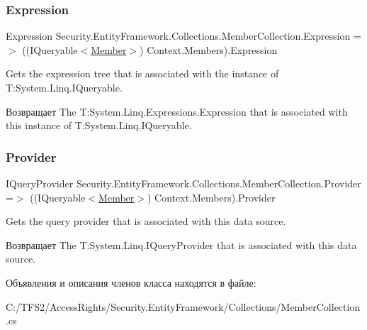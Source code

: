 \subsubsection{\texorpdfstring{Expression}{Expression}}
{\footnotesize\ttfamily Expression Security.\+Entity\+Framework.\+Collections.\+Member\+Collection.\+Expression =$>$ ((I\+Queryable$<$\hyperlink{class_security_1_1_model_1_1_member}{Member}$>$) Context.\+Members).Expression}



Gets the expression tree that is associated with the instance of T\+:\+System.\+Linq.\+I\+Queryable. 

\begin{DoxyReturn}{Возвращает}
The T\+:\+System.\+Linq.\+Expressions.\+Expression that is associated with this instance of T\+:\+System.\+Linq.\+I\+Queryable. 
\end{DoxyReturn}
\mbox{\label{class_security_1_1_entity_framework_1_1_collections_1_1_member_collection_ad6b2df9f7a78c07be30abd81acf88f77}} 
\subsubsection{\texorpdfstring{Provider}{Provider}}
{\footnotesize\ttfamily I\+Query\+Provider Security.\+Entity\+Framework.\+Collections.\+Member\+Collection.\+Provider =$>$ ((I\+Queryable$<$\hyperlink{class_security_1_1_model_1_1_member}{Member}$>$) Context.\+Members).Provider}



Gets the query provider that is associated with this data source. 

\begin{DoxyReturn}{Возвращает}
The T\+:\+System.\+Linq.\+I\+Query\+Provider that is associated with this data source. 
\end{DoxyReturn}


Объявления и описания членов класса находятся в файле\+:\begin{DoxyCompactItemize}
\item 
C\+:/\+T\+F\+S2/\+Access\+Rights/\+Security.\+Entity\+Framework/\+Collections/Member\+Collection.\+cs\end{DoxyCompactItemize}
